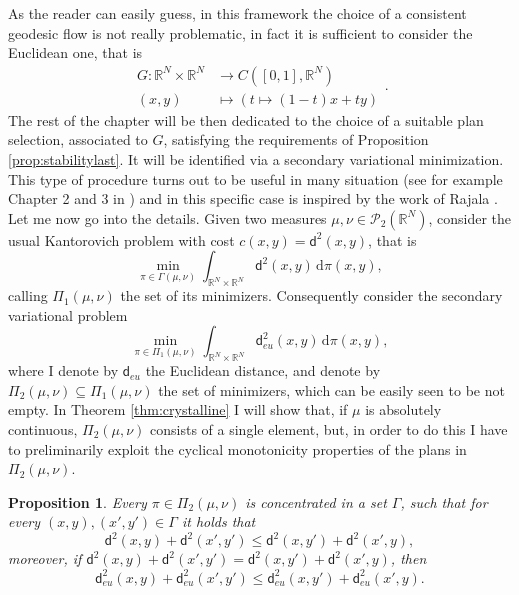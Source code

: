 \documentclass[11pt,twoside,a4paper]{article}
\newcommand{\R}{\mathbb{R}}
\newcommand{\de}{\ensuremath{\, \mathrm d}} %
\newcommand{\di}{\mathsf d} %
\newcommand{\ProbTwo}{\mathscr{P}_2}
\theoremstyle{theorem}
\newtheorem{prop}[theorem]{Proposition}
\theoremstyle{definition}
\theoremstyle{remark}
\theoremstyle{proof}
\begin{document}
As the reader can easily guess, in this framework the choice of a consistent geodesic flow is not really problematic, in fact it is sufficient to consider the Euclidean one, that is
\begin{equation*}
\begin{split}
      G: \R^N \times \R^N &\to C([0,1],\R^N) \\
    (x,y) &\mapsto (t \mapsto (1-t)x + t y)
\end{split}.
\end{equation*}
The rest of the chapter will be then dedicated to the choice of a suitable plan selection, associated to $G$, satisfying the requirements of Proposition \ref{prop:stabilitylast}. It will be identified via a secondary variational minimization. This type of procedure turns out to be useful in many situation (see for example Chapter 2 and 3 in \cite{santambrogio2015optimal}) and in this specific case is inspired by the work of Rajala \cite{rajala2013failure}. Let me now go into the details.
Given two measures $\mu,\nu\in\ProbTwo(\R^N)$, consider the usual Kantorovich problem with cost $c(x,y)=\di^2(x,y)$, that is 
\begin{equation*}
    \min_{\pi\in\Gamma(\mu,\nu)} \int_{\R^N\times \R^N} \di^2(x,y) \de \pi(x,y),
\end{equation*}
calling $\Pi_1(\mu,\nu)$ the set of its minimizers. Consequently consider the secondary variational problem 
\begin{equation}\label{eq:2ndvarproblem}
    \min_{\pi\in\Pi_1(\mu,\nu)} \int_{\R^N\times \R^N} \di^2_{eu}(x,y) \de \pi(x,y),
\end{equation}
where I denote by $\di_{eu}$ the Euclidean distance, and denote by $\Pi_2(\mu,\nu)\subseteq\Pi_1(\mu,\nu)$ the set of minimizers, which can be easily seen to be not empty. In Theorem \ref{thm:crystalline} I will show that, if $\mu$ is absolutely continuous, $\Pi_2(\mu,\nu)$ consists of a single element, but, in order to do this I have to preliminarily exploit the cyclical monotonicity properties of the plans in $\Pi_2(\mu,\nu)$.

\begin{prop}\label{prop:doublemonotonicity}
Every $\pi\in \Pi_2(\mu,\nu)$ is concentrated in a set $\Gamma$, such that for every $(x,y),(x',y')\in \Gamma$ it holds that
\begin{equation}\label{eq:monot1}
    \di^2(x,y)+\di^2(x',y') \leq \di^2(x,y')+ \di^2(x',y),
\end{equation}
moreover, if $\di^2(x,y)+\di^2(x',y') = \di^2 (x,y')+ \di^2(x',y)$, then 
\begin{equation}\label{eq:monot2}
    \di^2_{eu}(x,y)+\di^2_{eu}(x',y') \leq \di^2_{eu} (x,y')+ \di^2_{eu}(x',y).
\end{equation}
\end{prop}
\end{document}
